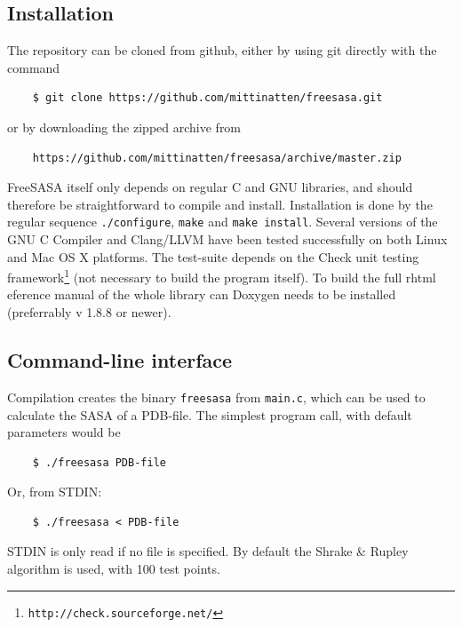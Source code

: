 \documentclass[a4paper,11pt]{article}
\begin{document}
\subsection{Installation} \label{sec:installing}

The repository can be cloned from github, either by using git directly
with the command
\begin{verbatim}
    $ git clone https://github.com/mittinatten/freesasa.git
\end{verbatim}
or by downloading the zipped archive from
\begin{verbatim}
    https://github.com/mittinatten/freesasa/archive/master.zip
\end{verbatim}
FreeSASA itself only depends on regular C and GNU libraries, and should
therefore be straightforward to compile and install. Installation is
done by the regular sequence \verb|./configure|, \verb|make| and
\verb|make install|. Several versions of the GNU C Compiler and
Clang/LLVM have been tested successfully on both Linux and Mac OS X
platforms. The test-suite depends on the Check unit testing
framework\footnote{\texttt{http://check.sourceforge.net/}} (not
necessary to build the program itself). To build the full rhtml eference 
manual of the whole library can Doxygen needs to be installed (preferrably
v 1.8.8 or newer).

\subsection{Command-line interface}

Compilation creates the binary \verb|freesasa| from
\verb|main.c|, which can be used to calculate the SASA of a
PDB-file. The simplest program call, with default parameters would be
\begin{verbatim}
    $ ./freesasa PDB-file
\end{verbatim}
Or, from STDIN:
\begin{verbatim} 
    $ ./freesasa < PDB-file    
\end{verbatim}
STDIN is only read if no file is specified.  By default the Shrake \&
Rupley algorithm is used, with 100 test points. 
\end{document}
